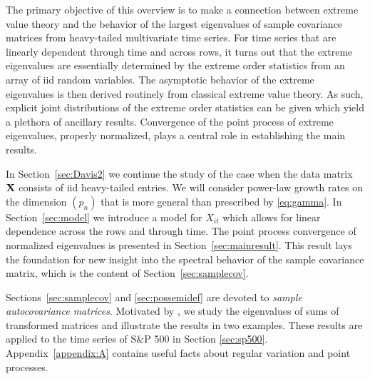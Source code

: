 The primary objective of this overview  is to make a connection between extreme value theory and the behavior of the largest eigenvalues of sample covariance matrices from heavy-tailed multivariate time series.  For time series that are linearly dependent through time and across rows, it turns out that the extreme eigenvalues are essentially determined by the extreme order statistics from an array of iid random variables.  The asymptotic behavior of the extreme eigenvalues is then derived routinely from classical extreme value theory.  As such, explicit joint distributions of the extreme order statistics can be given which yield a plethora of ancillary results.  
Convergence of the point process of extreme eigenvalues, properly normalized, plays a central role in establishing the main results.
\par
In Section~\ref{sec:Davis2} we continue the study of the case when the data matrix ${\mathbf X}$ consists of iid heavy-tailed entries.  We will consider power-law growth rates on the dimension $(p_n)$ that is more general than prescribed by \eqref{eq:gamma}.
In Section~\ref{sec:model} we introduce a model for $X_{it}$ which allows for linear dependence across the rows and through time.
The point process convergence of normalized eigenvalues is presented in Section~\ref{sec:mainresult}.
This result lays the foundation for new insight into the spectral behavior of the sample covariance matrix, which is the content of Section~\ref{sec:samplecov}.

Sections~\ref{sec:samplecov} and \ref{sec:possemidef} are devoted to {\em sample autocovariance matrices}.  Motivated by \cite{lam:yao}, we study the eigenvalues of sums of transformed matrices and illustrate the results in two examples. These results are applied to the time series of S\&P 500 in Section \ref{sec:sp500}.
Appendix~\ref{appendix:A} contains useful facts about regular variation and point processes.




